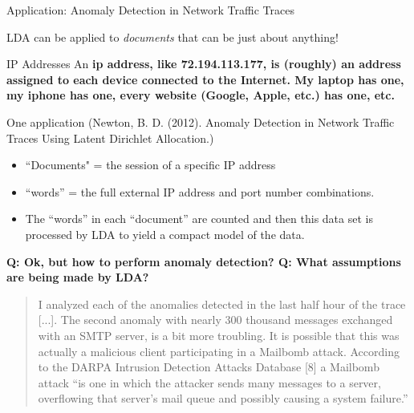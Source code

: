 \documentclass[10pt]{beamer}
\begin{document}
\begin{frame}{Application: Anomaly Detection in Network Traffic Traces }

LDA can be applied to  \textit{documents} that can be just about anything!

\begin{block}{IP Addresses}
An \bf{ip address}, like 72.194.113.177, is (roughly) an address assigned to each device connected to the Internet.   My laptop has one, my iphone has one, every website (Google, Apple, etc.) has one, etc. 
\end{block}

One application \tiny (Newton, B. D. (2012). Anomaly Detection in Network Traffic Traces Using Latent Dirichlet Allocation.) \normalsize 
\begin{itemize}
\item ``Documents"  =  the  session of a specific IP address
\item “words” = the full external IP address and port number
combinations. 
\item The “words” in each “document” are counted
and then this data set is processed by LDA to yield a compact
model of the data.
\end{itemize}

\vfill
\tiny \bf{Q:} Ok, but how to perform anomaly detection?
\tiny \bf{Q:} What assumptions are being made by LDA?
\end{frame}

\begin{frame}

\begin{quote}
I analyzed each of the anomalies detected in the last half
hour of the trace [...].  The second anomaly with nearly 300
thousand messages exchanged with an SMTP server, is a bit
more troubling. It is possible that this was actually a malicious
client participating in a Mailbomb attack. According to the
DARPA Intrusion Detection Attacks Database [8] a Mailbomb
attack ``is one in which the attacker sends many messages to
a server, overflowing that server’s mail queue and possibly
causing a system failure.” 
\end{quote}

\end{frame}
\end{document}
